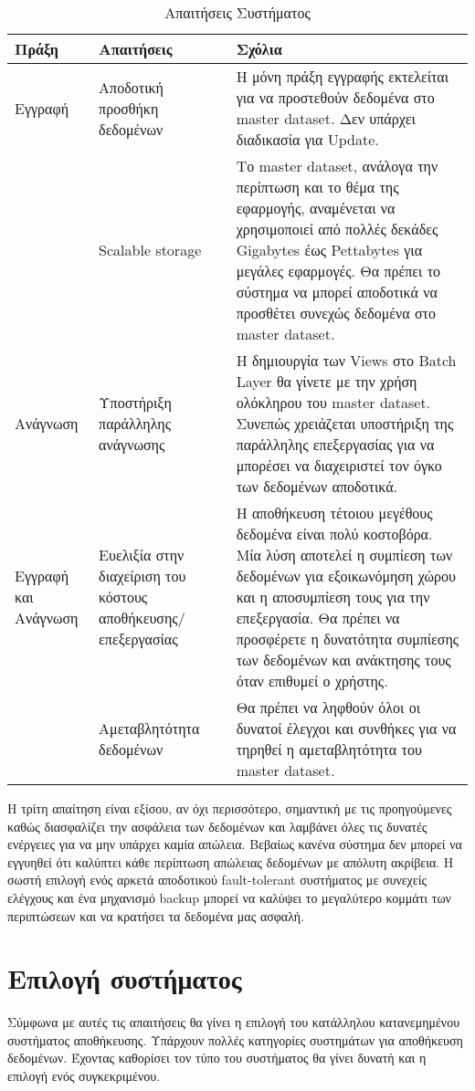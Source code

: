 \begin{table}[!htb]
\centering
\caption{Απαιτήσεις Συστήματος}
\label{my-label}
\begin{tabular}{|M{2.5cm}|p{5cm}|p{8cm}|}
\hline
{} 
                 Πράξη  & Απαιτήσεις & Σχόλια \\ \hline
                 Εγγραφή & Αποδοτική προσθήκη δεδομένων & Η μόνη πράξη εγγραφής εκτελείται για να προστεθούν δεδομένα στο master dataset. Δεν υπάρχει διαδικασία για Update. \\  
                   & Scalable storage & Το master dataset, ανάλογα την περίπτωση και το θέμα της εφαρμογής, αναμένεται  να χρησιμοποιεί από πολλές δεκάδες Gigabytes έως Pettabytes για μεγάλες εφαρμογές. Θα πρέπει το σύστημα να μπορεί αποδοτικά να προσθέτει συνεχώς δεδομένα στο master dataset. \\ \hline
                 Ανάγνωση  & Υποστήριξη παράλληλης ανάγνωσης &  Η δημιουργία των Views στο Batch Layer θα γίνετε με την χρήση ολόκληρου του master dataset. Συνεπώς χρειάζεται υποστήριξη της παράλληλης επεξεργασίας για να μπορέσει να διαχειριστεί τον όγκο των δεδομένων αποδοτικά.\\ \hline
                 Εγγραφή και Ανάγνωση  & Ευελιξία στην διαχείριση του κόστους αποθήκευσης/επεξεργασίας & Η αποθήκευση τέτοιου μεγέθους δεδομένα είναι πολύ κοστοβόρα. Μία λύση αποτελεί η συμπίεση των δεδομένων για εξοικωνόμηση χώρου και η αποσυμπίεση τους για την επεξεργασία. Θα πρέπει να προσφέρετε η δυνατότητα συμπίεσης των δεδομένων και ανάκτησης τους όταν επιθυμεί ο χρήστης. \\  
 & Αμεταβλητότητα δεδομένων & Θα πρέπει να ληφθούν όλοι οι δυνατοί έλεγχοι και συνθήκες για να τηρηθεί η αμεταβλητότητα του master dataset. \\ \hline
\end{tabular}
\end{table}
\clearpage

H τρίτη απαίτηση είναι εξίσου, αν όχι περισσότερο, σημαντική με τις προηγούμενες καθώς διασφαλίζει την ασφάλεια των δεδομένων και λαμβάνει όλες τις δυνατές ενέργειες για να μην υπάρχει καμία απώλεια. Βεβαίως κανένα σύστημα δεν μπορεί να εγγυηθεί ότι καλύπτει κάθε περίπτωση απώλειας δεδομένων με απόλυτη ακρίβεια. Η σωστή επιλογή ενός αρκετά αποδοτικού fault-tolerant συστήματος με συνεχείς ελέγχους και ένα μηχανισμό backup μπορεί να καλύψει το μεγαλύτερο κομμάτι των περιπτώσεων και να κρατήσει τα δεδομένα μας ασφαλή.


\section{Επιλογή συστήματος}
Σύμφωνα με αυτές τις απαιτήσεις θα γίνει η επιλογή του κατάλληλου κατανεμημένου συστήματος αποθήκευσης. Υπάρχουν πολλές κατηγορίες συστημάτων για αποθήκευση δεδομένων. Έχοντας καθορίσει τον τύπο του συστήματος θα γίνει δυνατή και η επιλογή ενός συγκεκριμένου.


